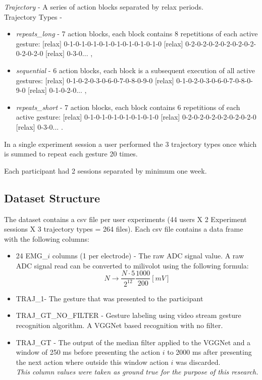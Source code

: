 \textit{Trajectory} - A series of action blocks separated by relax periods.\\
Trajectory Types - 
\begin{itemize}
    \item \textit{repeats\_long} - 7 action blocks, each block contains 8 repetitions of each active gesture: [relax] 0-1-0-1-0-1-0-1-0-1-0-1-0-1-0-1-0 [relax] 0-2-0-2-0-2-0-2-0-2-0-2-0-2-0-2-0 [relax] 0-3-0... ,
    \item \textit{sequential} - 6 action blocks, each block is a subsequent execution of all active gestures: [relax] 0-1-0-2-0-3-0-6-0-7-0-8-0-9-0 [relax] 0-1-0-2-0-3-0-6-0-7-0-8-0-9-0 [relax] 0-1-0-2-0... ,
    \item \textit{repeats\_short} - 7 action blocks, each block contains 6 repetitions of each active gesture: [relax] 0-1-0-1-0-1-0-1-0-1-0-1-0 [relax] 0-2-0-2-0-2-0-2-0-2-0-2-0 [relax] 0-3-0... .
\end{itemize}
In a single experiment session a user performed the 3 trajectory types once which is summed to repeat each gesture 20 times.

Each participant had 2 sessions separated by minimum one week.

\subsection{Dataset Structure}
The dataset contains a csv file per user experiments (44 users X 2 Experiment sessions X 3 trajectory types = 264 files).
Each csv file contains a data frame with the following columns:
\begin{itemize}
    \item 24 EMG\_$i$ columns (1 per electrode) - The raw ADC signal value. A raw ADC signal read can be converted to milivolot using the following formula:
    $$N \rightarrow \frac{N \cdot 5}{2^{12}}\frac{1000}{200}[mV]$$
    \item TRAJ\_1- The gesture that was presented to the participant
    \item TRAJ\_GT\_NO\_FILTER - Gesture labeling using video stream gesture recognition algorithm. A VGGNet based recognition with no filter.
    \item TRAJ\_GT - The output of the median filter applied to the VGGNet and a window of 250 ms before presenting the action $i$ to 2000 ms after presenting the next action where outside this window action $i$ was discarded. \\ \textit{This column values were taken as ground true for the purpose of this research.}
    
\end{itemize}

